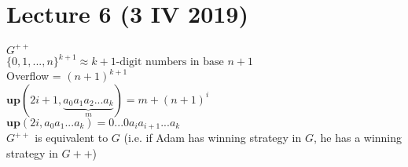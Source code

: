 \section{Lecture 6 (3 IV 2019)}
$G^{++}$\\
$\{0, 1, ..., n\}^{k+1} \approx k+1\text{-digit numbers in base }n+1$\\
Overflow = $(n+1)^{k+1}$\\

\noindent
$\textbf{up}(2i+1, \underbrace{a_0a_1a_2...a_k}_{m}) = m + (n+1)^{i}$\\
$\textbf{up}(2i, a_0a_1...a_k) = 0...0a_ia_{i+1}...a_k$\\

\noindent
$G^{++}$ is equivalent to $G$ (i.e. if Adam has winning strategy in $G$, he has
a winning strategy in $G++$)